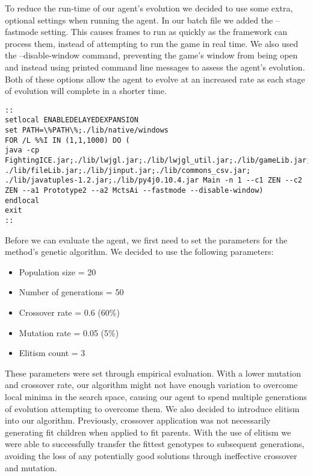 \documentclass[12pt,a4paper]{article}
\begin{document}
To reduce the run-time of our agent's evolution we decided to use some extra, optional settings when running the agent. In our batch file we added the --fastmode setting. This causes frames to run as quickly as the framework can process them, instead of attempting to run the game in real time. We also used the --disable-window command, preventing the game's window from being open and instead using printed command line messages to assess the agent's evolution. Both of these options allow the agent to evolve at an increased rate as each stage of evolution will complete in a shorter time.

\singlespacing
\begin{lstlisting}[caption=Batch file for running generations of individuals during evolution]
::
setlocal ENABLEDELAYEDEXPANSION
set PATH=\%PATH\%;./lib/native/windows
FOR /L %%I IN (1,1,1000) DO (
java -cp FightingICE.jar;./lib/lwjgl.jar;./lib/lwjgl_util.jar;./lib/gameLib.jar; ./lib/fileLib.jar;./lib/jinput.jar;./lib/commons_csv.jar; ./lib/javatuples-1.2.jar;./lib/py4j0.10.4.jar Main -n 1 --c1 ZEN --c2 ZEN --a1 Prototype2 --a2 MctsAi --fastmode --disable-window)
endlocal
exit
:: 
\end{lstlisting}
\onehalfspace

\newpage
Before we can evaluate the agent, we first need to set the parameters for the method's genetic algorithm. We decided to use the following parameters:
\begin{itemize}
\item {Population size = 20}
\item {Number of generations = 50}
\item {Crossover rate = 0.6 (60\%)}
\item {Mutation rate = 0.05 (5\%)}
\item {Elitism count = 3}
\end{itemize}

These parameters were set through empirical evaluation. With a lower mutation and crossover rate, our algorithm might not have enough variation to overcome local minima in the search space, causing our agent to spend multiple generations of evolution attempting to overcome them. We also decided to introduce elitism into our algorithm. Previously, crossover application was not necessarily generating fit children when applied to fit parents. With the use of elitism we were able to successfully transfer the fittest genotypes to subsequent generations, avoiding the loss of any potentially good solutions through ineffective crossover and mutation.\\
\end{document}
